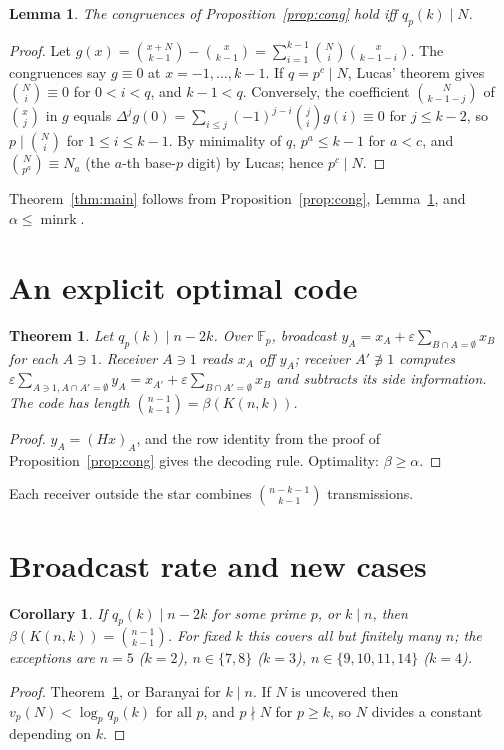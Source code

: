 \documentclass[conference]{IEEEtran}
\newtheorem{theorem}{Theorem}
\newtheorem{lemma}{Lemma}
\newtheorem{corollary}{Corollary}
\theoremstyle{remark}
\newcommand{\F}{\mathbb{F}}
\newcommand{\minrk}{\operatorname{minrk}}
\begin{document}
\begin{lemma}\label{lem:arith}
The congruences of Proposition~\ref{prop:cong} hold iff $q_p(k)\mid N$.
\end{lemma}
\begin{proof}
Let $g(x)=\binom{x+N}{k-1}-\binom x{k-1}=\sum_{i=1}^{k-1}\binom Ni\binom x{k-1-i}$. The congruences say $g\equiv0$ at
$x=-1,\dots,k-1$. If $q=p^c\mid N$, Lucas' theorem gives $\binom Ni\equiv0$ for $0<i<q$, and $k-1<q$. Conversely, the
coefficient $\binom N{k-1-j}$ of $\binom xj$ in $g$ equals $\Delta^jg(0)=\sum_{i\le j}(-1)^{j-i}\binom jig(i)\equiv0$ for
$j\le k-2$, so $p\mid\binom Ni$ for $1\le i\le k-1$. By minimality of $q$, $p^a\le k-1$ for $a<c$, and
$\binom N{p^a}\equiv N_a$ (the $a$-th base-$p$ digit) by Lucas; hence $p^c\mid N$.
\end{proof}

Theorem~\ref{thm:main} follows from Proposition~\ref{prop:cong}, Lemma~\ref{lem:arith}, and $\alpha\le\minrk$.

\section{An explicit optimal code}
\begin{theorem}\label{thm:code}
Let $q_p(k)\mid n-2k$. Over $\F_p$, broadcast $y_A=x_A+\varepsilon\sum_{B\cap A=\emptyset}x_B$ for each $A\ni1$.
Receiver $A\ni1$ reads $x_A$ off $y_A$; receiver $A'\not\ni1$ computes $\varepsilon\sum_{A\ni1,A\cap A'=\emptyset}y_A=
x_{A'}+\varepsilon\sum_{B\cap A'=\emptyset}x_B$ and subtracts its side information. The code has length
$\binom{n-1}{k-1}=\beta(K(n,k))$.
\end{theorem}
\begin{proof}
$y_A=(Hx)_A$, and the row identity from the proof of Proposition~\ref{prop:cong} gives the decoding rule.
Optimality: $\beta\ge\alpha$.
\end{proof}
Each receiver outside the star combines $\binom{n-k-1}{k-1}$ transmissions.

\section{Broadcast rate and new cases}
\begin{corollary}\label{cor:rate}
If $q_p(k)\mid n-2k$ for some prime $p$, or $k\mid n$, then $\beta(K(n,k))=\binom{n-1}{k-1}$. For fixed $k$ this covers
all but finitely many $n$; the exceptions are $n=5$ ($k=2$), $n\in\{7,8\}$ ($k=3$), $n\in\{9,10,11,14\}$ ($k=4$).
\end{corollary}
\begin{proof}
Theorem~\ref{thm:code}, or Baranyai for $k\mid n$. If $N$ is uncovered then $v_p(N)<\log_pq_p(k)$ for all $p$, and
$p\nmid N$ for $p\ge k$, so $N$ divides a constant depending on $k$.
\end{proof}
\end{document}
